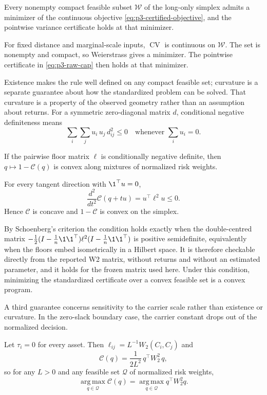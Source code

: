 \begin{theorem}
  \label{thm:p3-certified-minimizer}
  Every nonempty compact feasible subset $\mathcal W$ of the long-only
  simplex admits a minimizer of the continuous objective
  \eqref{eq:p3-certified-objective}, and the pointwise variance certificate
  holds at that minimizer.
\end{theorem}

For fixed distance and marginal-scale inputs, $\operatorname{CV}$ is continuous
on $\mathcal W$.
The set is nonempty and compact, so Weierstrass gives a minimizer.
The pointwise certificate in \eqref{eq:p3-raw-cap} then holds at that
minimizer.

Existence makes the rule well defined on any compact feasible set;
curvature is a separate guarantee about how the standardized problem
can be solved.
That curvature is a property of the observed geometry rather than an
assumption about returns.
For a symmetric zero-diagonal matrix $d$, conditional negative definiteness
means
\[
  \sum_i\sum_j u_i\,u_j\,d_{ij}^2\le0
  \quad\text{whenever }\sum_i u_i=0.
\]

\begin{theorem}\label{thm:p3-certificate-convexity}
  If the pairwise floor matrix $\ell$ is conditionally negative definite, then
  $q\mapsto1-\mathcal C(q)$ is convex along mixtures of normalized risk weights.
\end{theorem}

For every tangent direction with $\1^\top u=0$,
\[
  \frac{d^2}{dt^2}\mathcal C(q+tu)=u^\top\ell^2u\le0.
\]
Hence $\mathcal C$ is concave and $1-\mathcal C$ is convex on the simplex.

By Schoenberg's criterion the condition holds exactly when the double-centred
matrix
$-\tfrac12(I-\tfrac1n\1\1^{\top})\ell^2
(I-\tfrac1n\1\1^{\top})$
is positive semidefinite, equivalently when the floors embed isometrically in a
Hilbert space.
It is therefore checkable directly from the reported W2 matrix, without
returns and without an estimated parameter, and it holds for the frozen matrix
used here.
Under this condition, minimizing the standardized certificate over a convex
feasible set is a convex program.

A third guarantee concerns sensitivity to the carrier scale rather
than existence or curvature.
In the zero-slack boundary case, the carrier constant drops out of
the normalized decision.

\begin{corollary}
  \label{cor:p3-carrier-invariance}
  Let $\tau_i=0$ for every asset. Then $\ell_{ij}=L^{-1}W_2(C_i,C_j)$ and
  \begin{equation}\label{eq:p3-zero-slack-certificate}
    \mathcal C(q)=\frac{1}{2L^2}\,q^{\top}W_2^2\,q,
  \end{equation}
  so for any $L>0$ and any feasible set $\mathcal Q$ of normalized risk
  weights,
  \[
    \operatorname*{arg\,max}_{q\in\mathcal Q}\mathcal C(q)
    =\operatorname*{arg\,max}_{q\in\mathcal Q}q^{\top}W_2^2q.
  \]
\end{corollary}

